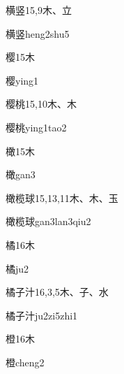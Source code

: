 \begin{Entry}{横竖}{15,9}{⽊、⽴}
  \begin{Phonetics}{横竖}{heng2shu5}
  \end{Phonetics}
\end{Entry}

\begin{Entry}{樱}{15}{⽊}
  \begin{Phonetics}{樱}{ying1}
  \end{Phonetics}
\end{Entry}

\begin{Entry}{樱桃}{15,10}{⽊、⽊}
  \begin{Phonetics}{樱桃}{ying1tao2}
  \end{Phonetics}
\end{Entry}

\begin{Entry}{橄}{15}{⽊}
  \begin{Phonetics}{橄}{gan3}
  \end{Phonetics}
\end{Entry}

\begin{Entry}{橄榄球}{15,13,11}{⽊、⽊、⽟}
  \begin{Phonetics}{橄榄球}{gan3lan3qiu2}
  \end{Phonetics}
\end{Entry}

\begin{Entry}{橘}{16}{⽊}
  \begin{Phonetics}{橘}{ju2}
  \end{Phonetics}
\end{Entry}

\begin{Entry}{橘子汁}{16,3,5}{⽊、⼦、⽔}
  \begin{Phonetics}{橘子汁}{ju2zi5zhi1}
  \end{Phonetics}
\end{Entry}

\begin{Entry}{橙}{16}{⽊}
  \begin{Phonetics}{橙}{cheng2}
  \end{Phonetics}
\end{Entry}

